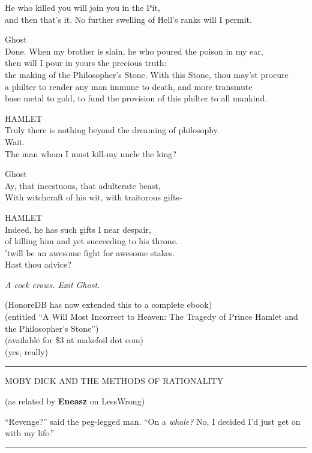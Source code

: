 He who killed you will join you in the Pit,\\and then that's it. No
further swelling of Hell's ranks will I permit.

Ghost\\Done. When my brother is slain, he who poured the poison in my
ear,\\then will I pour in yours the precious truth:\\the making of the
Philosopher's Stone. With this Stone, thou may'st procure\\a philter to
render any man immune to death, and more transmute\\base metal to gold,
to fund the provision of this philter to all mankind.

HAMLET\\Truly there is nothing beyond the dreaming of
philosophy.\\Wait.\\The man whom I must kill-my uncle the king?

Ghost\\Ay, that incestuous, that adulterate beast,\\With witchcraft of
his wit, with traitorous gifts-

HAMLET\\Indeed, he has such gifts I near despair,\\of killing him and
yet succeeding to his throne.\\'twill be an awesome fight for awesome
stakes.\\Hast thou advice?

\emph{A cock crows. Exit Ghost.}

(HonoreDB has now extended this to a complete ebook)\\(entitled ``A Will
Most Incorrect to Heaven: The Tragedy of Prince Hamlet and the
Philosopher's Stone'')\\(available for \$3 at makefoil dot com)\\(yes,
really)

\begin{center}\rule{3in}{0.4pt}\end{center}

MOBY DICK AND THE METHODS OF RATIONALITY

(as related by \textbf{Eneasz} on LessWrong)

``Revenge?'' said the peg-legged man. ``On a \emph{whale?} No, I decided
I'd just get on with my life.''

\begin{center}\rule{3in}{0.4pt}\end{center}

